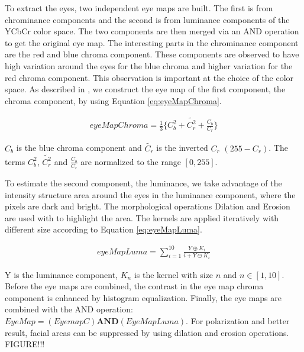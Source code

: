 


To extract the eyes, two independent eye maps are built. The first is from chrominance components and the second is from luminance components of the YCbCr color space. The two components are then merged via an AND operation to get the original eye map. The interesting parts in the chrominance component are the red and blue chroma component. These components are observed to have high variation around the eyes for the blue chroma and higher variation for the red chroma component. This observation is important at the choice of the color space. As described in \cite{fdInColorImages}, we construct the eye map of the first component, the chroma component, by using Equation \ref{eq:eyeMapChroma}.

\begin{equation} \label{eq:eyeMapChroma}
\begin{split}
eyeMapChroma = \frac{1}{3} \lbrace C_b^2 + \tilde{C_r^2} + \frac{C_b}{C_r} \rbrace
\end{split}
\end{equation}

$C_b$ is the blue chroma component and $\tilde{C_r}$ is the inverted $C_r$ $(255 - C_r)$. The terms $C_b^2$, $\tilde{C_r^2}$ and $\frac{C_b}{C_r}$ are normalized to the range $[0, 255]$.

To estimate the second component, the luminance, we take advantage of the intensity structure area around the eyes in the luminance component, where the pixels are dark and bright. The morphological operations Dilation and Erosion are used with to highlight the area. The kernels are applied iteratively with different size according to Equation \ref{eq:eyeMapLuma}.

\begin{equation} \label{eq:eyeMapLuma}
\begin{split}
  eyeMapLuma = \sum_{i=1}^{10}\frac{Y\oplus K_{i}}{i + Y\ominus  K_{i}}
\end{split}
\end{equation}

Y is the luminance component, $K_n$ is the kernel with size $n$ and $ n \in [1,10]$. Before the eye maps are combined, the contrast in the eye map chroma component is enhanced by histogram equalization. Finally, the eye maps are combined with the AND operation: $EyeMap = (EyemapC) \textbf{AND} (EyeMapLuma)$. For polarization and better result, facial areas can be suppressed by using dilation and erosion operations. FIGURE!!!


